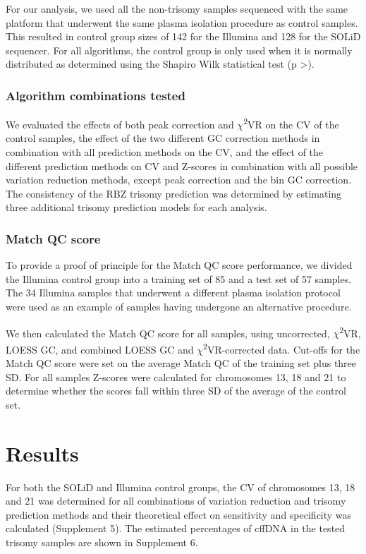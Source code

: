 For our analysis, we used all the non-trisomy samples sequenced with the same platform that underwent the same plasma isolation procedure as control samples. 
This resulted in control group sizes of 142 for the Illumina and 128 for the SOLiD sequencer. 
For all algorithms, the control group is only used when it is normally distributed as determined using the Shapiro Wilk statistical test (p \textgreater{}).

\subsubsection{Algorithm combinations tested}
We evaluated the effects of both peak correction and $\chi$\textsuperscript{2}VR on the CV of the control samples, the effect of the two different GC correction methods in combination with all prediction methods on the CV, and the effect of the different prediction methods on CV and Z-scores in combination with all possible variation reduction methods, except peak correction and the bin GC correction. 
The consistency of the RBZ trisomy prediction was determined by estimating three additional trisomy prediction models for each analysis.

\subsubsection{Match QC score}
To provide a proof of principle for the Match QC score performance, we divided the Illumina control group into a training set of 85 and a test set of 57 samples. 
The 34 Illumina samples that underwent a different plasma isolation protocol were used as an example of samples having undergone an alternative procedure.

We then calculated the Match QC score for all samples, using uncorrected, $\chi$\textsuperscript{2}VR, LOESS GC, and combined LOESS GC and $\chi$\textsuperscript{2}VR-corrected data. 
Cut-offs for the Match QC score were set on the average Match QC of the training set plus three SD. 
For all samples Z-scores were calculated for chromosomes 13, 18 and 21 to determine whether the scores fall within three SD of the average of the control set.

\section{Results}\label{Results}
For both the SOLiD and Illumina control groups, the CV of chromosomes 13, 18 and 21 was determined for all combinations of variation reduction and trisomy prediction methods and their theoretical effect on sensitivity and specificity was calculated (Supplement 5). 
The estimated percentages of cffDNA in the tested trisomy samples are shown in Supplement 6.

